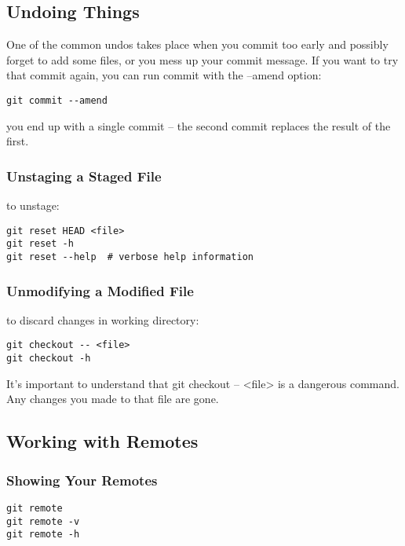 \documentclass[11pt]{article}
\begin{document}
\subsection{Undoing Things}
\label{sec:org439448e}
One of the common undos takes place when you commit too early and possibly forget to add some files, or you mess up your commit message. If you want to try that commit again, you can run commit with the --amend option:\\
\begin{verbatim}
git commit --amend
\end{verbatim}


you end up with a single commit -- the second commit replaces the result of the first.\\

\subsubsection{Unstaging a Staged File}
\label{sec:org649e381}
to unstage:\\
\begin{verbatim}
git reset HEAD <file>
git reset -h
git reset --help  # verbose help information
\end{verbatim}


\subsubsection{Unmodifying a Modified File}
\label{sec:org5b5711d}
to discard changes in working directory:\\
\begin{verbatim}
git checkout -- <file>
git checkout -h
\end{verbatim}

It's important to understand that git checkout -- <file> is a dangerous command. Any changes you made to that file are gone.\\


\subsection{Working with Remotes}
\label{sec:orgc76c204}
\subsubsection{Showing Your Remotes}
\label{sec:orga2b2134}
\begin{verbatim}
git remote
git remote -v
git remote -h
\end{verbatim}
\end{document}

